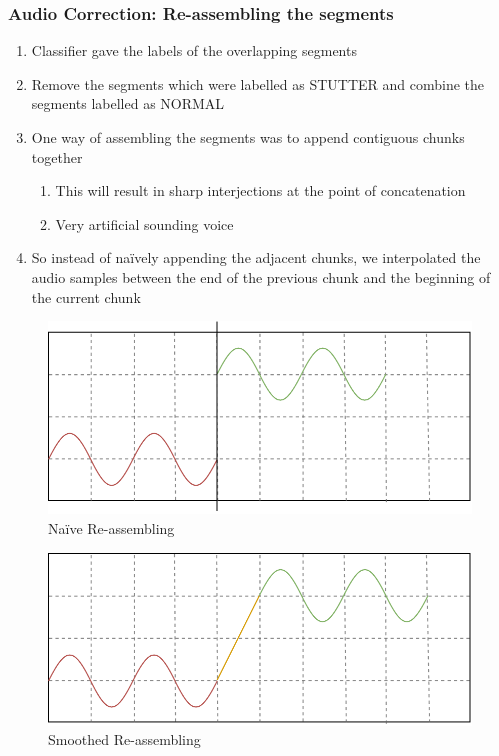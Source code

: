 \documentclass{beamer}
\begin{document}
\begin{frame}[allowframebreaks]
\frametitle{Audio Correction: Re-assembling the segments}
\begin{enumerate}
 \item Classifier gave the labels of the overlapping segments
 \item Remove the segments which were labelled as STUTTER and combine the segments labelled as NORMAL
 \item One way of assembling the segments was to append contiguous chunks together
 \begin{enumerate}
  \item This will result in sharp interjections at the point of concatenation
  \item Very artificial sounding voice
 \end{enumerate}
 \item So instead of na\"ively appending the adjacent chunks, we interpolated the audio samples between the end of the previous chunk and the beginning of the current chunk
\end{enumerate}

\begin{figure}[!ht]
    \centering
    \includegraphics[scale=0.8]{NaiveReassembling.pdf}
    \caption{Na\"ive Re-assembling}
    \label{fig:naiveReassembling}
\end{figure}
\begin{figure}[!ht]
\centering
    \includegraphics[scale=0.8]{SmoothReassembling.pdf}
    \caption{Smoothed Re-assembling}
    \label{fig:smoothedReassembling}
\end{figure}

\end{frame}
\end{document}
